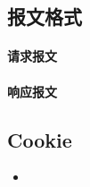 \subsection{报文格式}

\paragraph{请求报文}

\paragraph{响应报文}


\subsection{Cookie}

\begin{itemize}
    \item 
\end{itemize}

